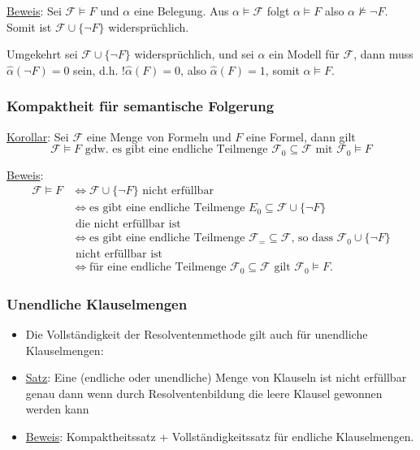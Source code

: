 \documentclass{scrartcl}
\begin{document}
\underline{Beweis}: Sei $\mathcal{F} \models F$ und $\alpha$ eine Belegung. Aus $\alpha \models \mathcal{F}$ folgt $\alpha \models F$ also $\alpha \nvDash \neg F$. Somit ist $\mathcal{F} \cup \{\neg F\}$ widersprüchlich.

Umgekehrt sei $\mathcal{F} \cup \{\neg F\}$ widersprüchlich, und sei $\alpha$ ein Modell für $\mathcal{F}$, dann muss $\widehat{\alpha}(\neg F) = 0$ sein, d.h. $!\widehat{\alpha}(F) = 0$, also $\widehat{\alpha}(F) = 1$, somit $\alpha \models F$.

\subsubsection{Kompaktheit für semantische Folgerung}

\underline{Korollar}: Sei $\mathcal{F}$ eine Menge von Formeln und $F$ eine Formel, dann gilt
\begin{equation}
	\mathcal{F} \models F \text{ gdw. es gibt eine endliche Teilmenge } \mathcal{F}_0 \subseteq \mathcal{F} \text{ mit } \mathcal{F}_0 \models F
\end{equation}

\underline{Beweis}:
\begin{equation}
	\begin{split}
		\mathcal{F} \models F &\iff \mathcal{F} \cup \{\neg F\} \text{ nicht erfüllbar} \\
		&\iff \text{es gibt eine endliche Teilmenge } E_0 \subseteq \mathcal{F} \cup \{\neg F\} \\
		& \text{ die nicht erfüllbar ist} \\
		&\iff \text{es gibt eine endliche Teilmenge } \mathcal{F}_= \subseteq \mathcal{F} \text{, so dass } \mathcal{F}_0 \cup \{\neg F\} \\
		& \text{ nicht erfüllbar ist} \\
		&\iff \text{für eine endliche Teilmenge } \mathcal{F}_0 \subseteq \mathcal{F} \text{ gilt } \mathcal{F}_0 \models F.
	\end{split}
\end{equation}

\subsubsection{Unendliche Klauselmengen}

\begin{itemize}
	\item Die Vollständigkeit der Resolventenmethode gilt auch für unendliche Klauselmengen:
	\item \underline{Satz}: Eine (endliche oder unendliche) Menge von Klauseln ist nicht erfüllbar genau dann wenn durch Resolventenbildung die leere Klausel gewonnen werden kann
	\item \underline{Beweis}: Kompaktheitssatz + Vollständigkeitssatz für endliche Klauselmengen.
\end{itemize}
\end{document}
